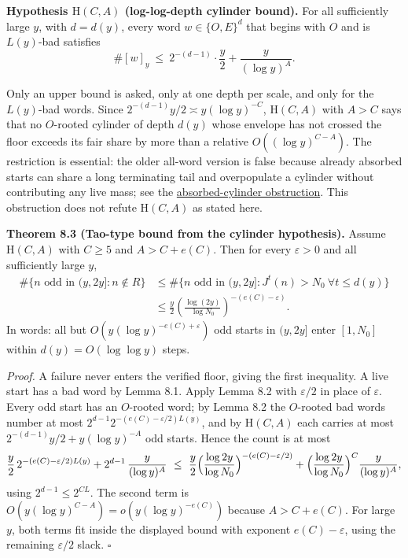 \documentclass[11pt,a4paper]{article}
\begin{document}
\textbf{Hypothesis \(\mathrm H(C,A)\) (log-log-depth cylinder bound).}
For all sufficiently large \(y\), with \(d=d(y)\), every word
\(w\in\{O,E\}^d\) that begins with \(O\) and is \(L(y)\)-bad satisfies
\[
\#[w]_y\ \le\ 2^{-(d-1)}\cdot\frac y2+\frac{y}{(\log y)^{A}} .
\]

Only an upper bound is asked, only at one depth per scale, and only for
the \(L(y)\)-bad words. Since \(2^{-(d-1)}y/2\asymp y(\log y)^{-C}\),
\(\mathrm H(C,A)\) with \(A>C\) says that no \(O\)-rooted cylinder of
depth \(d(y)\) whose envelope has not crossed the floor exceeds its fair
share by more than a relative \(O((\log y)^{C-A})\). The restriction is
essential: the older all-word version is false because already absorbed
starts can share a long terminating tail and overpopulate a cylinder
without contributing any live mass; see the
\href{https://github.com/sneakyweasel/btlab/blob/main/docs/problems/juggler_absorbed_cylinder.md}{absorbed-cylinder
obstruction}. This obstruction does not refute \(\mathrm H(C,A)\) as
stated here.

\textbf{Theorem 8.3 (Tao-type bound from the cylinder hypothesis).}
Assume \(\mathrm H(C,A)\) with \(C\ge 5\) and \(A>C+e(C)\). Then for
every \(\varepsilon>0\) and all sufficiently large \(y\), \[
\begin{aligned}
\#\{n\text{ odd in }(y,2y]:n\notin R\}
&\le\#\{n\text{ odd in }(y,2y]:J^t(n)>N_0\ \forall t\le d(y)\}\\
&\le\frac y2\left(\frac{\log(2y)}{\log N_0}\right)^{-(e(C)-\varepsilon)}.
\end{aligned}
\] In words: all but \(O(y(\log y)^{-e(C)+\varepsilon})\) odd starts in
\((y,2y]\) enter \([1,N_0]\) within \(d(y)=O(\log\log y)\) steps.

\emph{Proof.} A failure never enters the verified floor, giving the
first inequality. A live start has a bad word by Lemma 8.1. Apply Lemma
8.2 with \(\varepsilon/2\) in place of \(\varepsilon\). Every odd start
has an \(O\)-rooted word; by Lemma 8.2 the \(O\)-rooted bad words number
at most \(2^{d-1}2^{-(e(C)-\varepsilon/2)L(y)}\), and by
\(\mathrm H(C,A)\) each carries at most \(2^{-(d-1)}y/2+y(\log y)^{-A}\)
odd starts. Hence the count is at most \[
\frac y2\,2^{-(e(C)-\varepsilon/2)L(y)}+2^{d-1}\,\frac{y}{(\log y)^A}
\ \le\ \frac y2\Bigl(\frac{\log 2y}{\log N_0}\Bigr)^{-(e(C)-\varepsilon/2)}
+\Bigl(\frac{\log 2y}{\log N_0}\Bigr)^{C}\frac{y}{(\log y)^{A}},
\] using \(2^{d-1}\le 2^{CL}\). The second term is
\(O(y(\log y)^{C-A})=o(y(\log y)^{-e(C)})\) because \(A>C+e(C)\). For
large \(y\), both terms fit inside the displayed bound with exponent
\(e(C)-\varepsilon\), using the remaining \(\varepsilon/2\) slack.
\(\square\)
\end{document}
